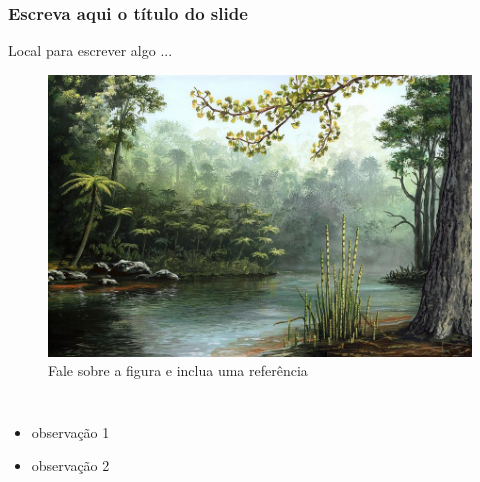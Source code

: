 \documentclass[aspectratio=169]{beamer} %
\begin{document}
{

{ \begin{frame}
\frametitle{Escreva aqui o título do slide}

	Local para escrever algo ...


	\begin{figure}
		\centering
		\includegraphics[scale=0.7]{images/jur.jpg}
		\caption{Fale sobre a figura e inclua uma referência \cite{thomas2022}}
	\end{figure}

\begin{flushleft}
    \begin{columns}

        \centering

     \begin{itemize}
	     \pause
	     \item observação 1
	     \pause
	     \item observação 2
     \end{itemize}    
    

\end{columns}
\end{flushleft}
\end{frame}}}
\end{document}
